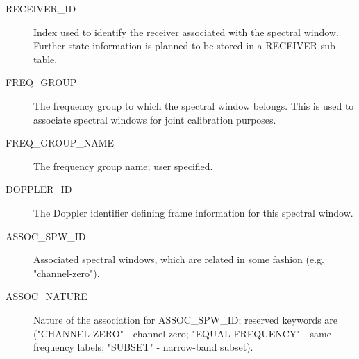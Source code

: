 \documentclass{article}
\begin{document}
\begin{description}
\item[RECEIVER\_ID] Index used to identify the receiver associated
with the spectral window. Further state information is planned to be
stored in a RECEIVER sub-table.

\item[FREQ\_GROUP] The frequency group to which the spectral window belongs.
This is used to associate spectral windows for joint calibration purposes.

\item[FREQ\_GROUP\_NAME] The frequency group name; user specified.

\item[DOPPLER\_ID] The Doppler identifier defining frame information
for this spectral window.

\item[ASSOC\_SPW\_ID] Associated spectral windows, which are related
in some fashion (e.g. "channel-zero").

\item[ASSOC\_NATURE] Nature of the association for ASSOC\_SPW\_ID;
reserved keywords are ("CHANNEL-ZERO" - channel zero;
"EQUAL-FREQUENCY" - same frequency labels; "SUBSET" - narrow-band
subset).

\end{description}
\end{document}
